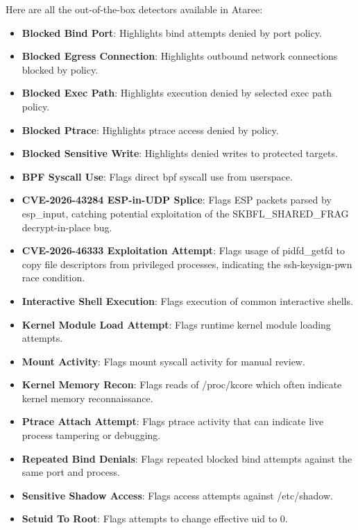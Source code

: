 \documentclass[
  12pt,
]{report}
\providecommand{\tightlist}{%
  \setlength{\itemsep}{0pt}\setlength{\parskip}{0pt}}
\begin{document}
Here are all the out-of-the-box detectors available in Ataree:

\begin{itemize}
\tightlist
\item
  \textbf{Blocked Bind Port}: Highlights bind attempts denied by port
  policy.
\item
  \textbf{Blocked Egress Connection}: Highlights outbound network
  connections blocked by policy.
\item
  \textbf{Blocked Exec Path}: Highlights execution denied by selected
  exec path policy.
\item
  \textbf{Blocked Ptrace}: Highlights ptrace access denied by policy.
\item
  \textbf{Blocked Sensitive Write}: Highlights denied writes to
  protected targets.
\item
  \textbf{BPF Syscall Use}: Flags direct bpf syscall use from userspace.
\item
  \textbf{CVE-2026-43284 ESP-in-UDP Splice}: Flags ESP packets parsed by
  esp\_input, catching potential exploitation of the SKBFL\_SHARED\_FRAG
  decrypt-in-place bug.
\item
  \textbf{CVE-2026-46333 Exploitation Attempt}: Flags usage of
  pidfd\_getfd to copy file descriptors from privileged processes,
  indicating the ssh-keysign-pwn race condition.
\item
  \textbf{Interactive Shell Execution}: Flags execution of common
  interactive shells.
\item
  \textbf{Kernel Module Load Attempt}: Flags runtime kernel module
  loading attempts.
\item
  \textbf{Mount Activity}: Flags mount syscall activity for manual
  review.
\item
  \textbf{Kernel Memory Recon}: Flags reads of /proc/kcore which often
  indicate kernel memory reconnaissance.
\item
  \textbf{Ptrace Attach Attempt}: Flags ptrace activity that can
  indicate live process tampering or debugging.
\item
  \textbf{Repeated Bind Denials}: Flags repeated blocked bind attempts
  against the same port and process.
\item
  \textbf{Sensitive Shadow Access}: Flags access attempts against
  /etc/shadow.
\item
  \textbf{Setuid To Root}: Flags attempts to change effective uid to 0.
\end{itemize}

\clearpage
\end{document}
